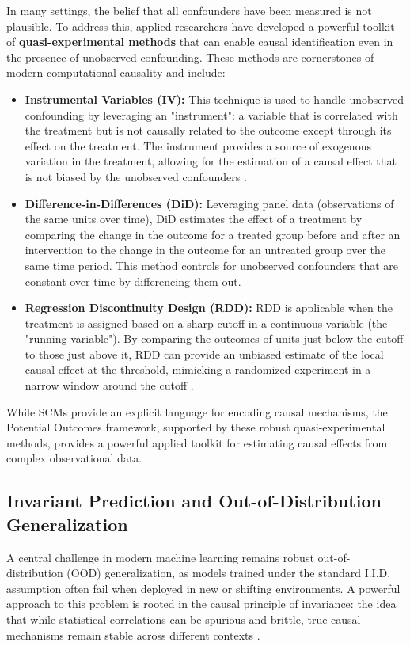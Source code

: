 {In many settings, the belief that all confounders have been measured is not plausible. To address this, applied researchers have developed a powerful toolkit of \textbf{quasi-experimental methods} that can enable causal identification even in the presence of unobserved confounding. These methods are cornerstones of modern computational causality and include:
\begin{itemize}
    \item \textbf{Instrumental Variables (IV):} This technique is used to handle unobserved confounding by leveraging an "instrument": a variable that is correlated with the treatment but is not causally related to the outcome except through its effect on the treatment. The instrument provides a source of exogenous variation in the treatment, allowing for the estimation of a causal effect that is not biased by the unobserved confounders \cite{angrist1996identification}.
    \item \textbf{Difference-in-Differences (DiD):} Leveraging panel data (observations of the same units over time), DiD estimates the effect of a treatment by comparing the change in the outcome for a treated group before and after an intervention to the change in the outcome for an untreated group over the same time period. This method controls for unobserved confounders that are constant over time by differencing them out\cite{callaway2021difference}.
    \item \textbf{Regression Discontinuity Design (RDD):} RDD is applicable when the treatment is assigned based on a sharp cutoff in a continuous variable (the "running variable"). By comparing the outcomes of units just below the cutoff to those just above it, RDD can provide an unbiased estimate of the local causal effect at the threshold, mimicking a randomized experiment in a narrow window around the cutoff \cite{imbens2008regression}.
\end{itemize}

While SCMs provide an explicit language for encoding causal mechanisms, the Potential Outcomes framework, supported by these robust quasi-experimental methods, provides a powerful applied toolkit for estimating causal effects from complex observational data. 

\subsection{Invariant Prediction and Out-of-Distribution Generalization}

A central challenge in modern machine learning remains robust out-of-distribution (OOD) generalization, as models trained under the standard I.I.D. assumption often fail when deployed in new or shifting environments. A powerful approach to this problem is rooted in the causal principle of invariance: the idea that while statistical correlations can be spurious and brittle, true causal mechanisms remain stable across different contexts \cite{pearl2000causality}.

}
